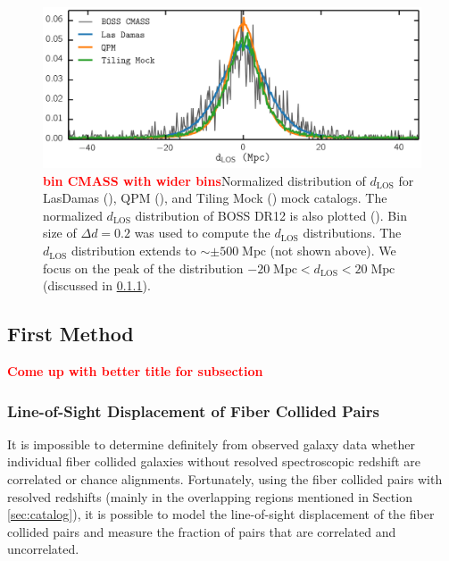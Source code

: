 \documentclass{emulateapj}
\newcommand{\todo}[1]{{\bf \textcolor{red}{ #1}}}
\begin{document}
\begin{figure}
\begin{center}
\includegraphics[scale=0.575]{fcpaper_dlos_dist.png}
\caption{\todo{bin CMASS with wider bins}Normalized distribution of $d_{\mathrm{LOS}}$ for LasDamas (\ldgcolor), QPM (\qpmcolor), and Tiling Mock (\tmcolor) mock catalogs. The normalized $d_{\mathrm{LOS}}$ distribution of BOSS DR12 is also plotted (\cmasscolor). Bin size of $\Delta d = 0.2$ was used to compute the $d_{\mathrm{LOS}}$ distributions. The $d_\mathrm{LOS}$ distribution extends to $\sim \pm 500 \; \mathrm{Mpc}$ (not shown above). We focus on the peak of the distribution $-20 \; \mathrm{Mpc} < d_\mathrm{LOS} < 20 \;\mathrm{Mpc}$ (discussed in \ref{sec:dlos}).} \label{fig:d_los}
\end{center}
\end{figure}
\subsection{First Method} \label{sec:dlospeak}
\todo{Come up with better title for subsection}
\subsubsection{Line-of-Sight Displacement of Fiber Collided Pairs} \label{sec:dlos}
It is impossible to determine definitely from observed galaxy data whether individual fiber collided galaxies without resolved spectroscopic redshift are correlated or chance alignments. Fortunately, using the fiber collided pairs with resolved redshifts (mainly in the overlapping regions mentioned in Section \ref{sec:catalog}), it is possible to model the line-of-sight displacement of the fiber collided pairs and measure the fraction of pairs that are correlated and uncorrelated. 
\end{document}
